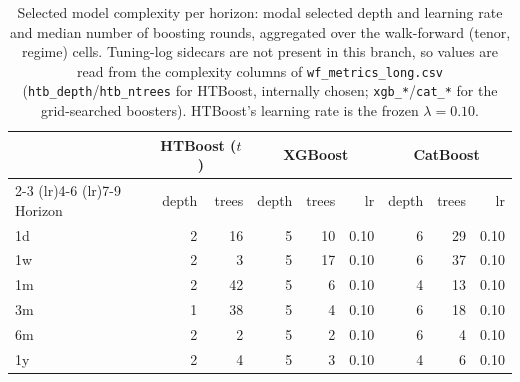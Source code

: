 \begin{table}[htbp]
\centering
\caption{Selected model complexity per horizon: modal selected depth and learning rate and median number of boosting rounds, aggregated over the walk-forward (tenor, regime) cells. Tuning-log sidecars are not present in this branch, so values are read from the complexity columns of \texttt{wf\_metrics\_long.csv} (\texttt{htb\_depth}/\texttt{htb\_ntrees} for HTBoost, internally chosen; \texttt{xgb\_*}/\texttt{cat\_*} for the grid-searched boosters). HTBoost's learning rate is the frozen $\lambda=0.10$.}
\label{tab:app_selected}
\footnotesize
\begin{tabular}{lrrrrrrrr}
\toprule
\multicolumn{1}{c}{} & \multicolumn{2}{c}{HTBoost ($t$)} & \multicolumn{3}{c}{XGBoost} & \multicolumn{3}{c}{CatBoost} \\
\cmidrule(lr){2-3} \cmidrule(lr){4-6} \cmidrule(lr){7-9}
Horizon & depth & trees & depth & trees & lr & depth & trees & lr \\
\midrule
1d & 2 & 16 & 5 & 10 & 0.10 & 6 & 29 & 0.10 \\
1w & 2 & 3 & 5 & 17 & 0.10 & 6 & 37 & 0.10 \\
1m & 2 & 42 & 5 & 6 & 0.10 & 4 & 13 & 0.10 \\
3m & 1 & 38 & 5 & 4 & 0.10 & 6 & 18 & 0.10 \\
6m & 2 & 2 & 5 & 2 & 0.10 & 6 & 4 & 0.10 \\
1y & 2 & 4 & 5 & 3 & 0.10 & 4 & 6 & 0.10 \\
\bottomrule
\end{tabular}
\end{table}
